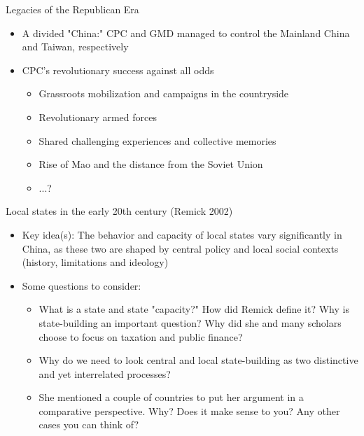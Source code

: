 \documentclass[
  10pt,
  ignorenonframetext,
]{beamer}
\begin{document}
\begin{frame}{Legacies of the Republican Era}
\protect\hypertarget{legacies-of-the-republican-era}{}
\begin{itemize}
  \item A divided "China:" CPC and GMD managed to control the Mainland China and Taiwan, respectively
  \vspace{0.6cm}
  \item CPC's revolutionary success against all odds
  \vspace{0.1cm}
  \begin{itemize}
    \item Grassroots mobilization and campaigns in the countryside
    \item Revolutionary armed forces
    \item Shared challenging experiences and collective memories
    \item Rise of Mao and the distance from the Soviet Union
    \item ...?
  \end{itemize}
\end{itemize}
\end{frame}

\begin{frame}{Local states in the early 20th century (Remick 2002)}
\protect\hypertarget{local-states-in-the-early-20th-century-remick-2002}{}
\begin{itemize}
  \item Key idea(s): The behavior and capacity of local states vary significantly in China, as these two are shaped by central policy and local social contexts (history, limitations and ideology)
  \vspace{0.3cm}
  \item Some questions to consider:
  \vspace{0.1cm}
  \begin{itemize}
    \item What is a state and state "capacity?" How did Remick define it? Why is state-building an important question? Why did she and many scholars choose to focus on taxation and public finance?
    \item Why do we need to look central and local state-building as two distinctive and yet interrelated processes?
    \item She mentioned a couple of countries to put her argument in a comparative perspective. Why? Does it make sense to you? Any other cases you can think of?
  \end{itemize}
\end{itemize}
\end{frame}
\end{document}
